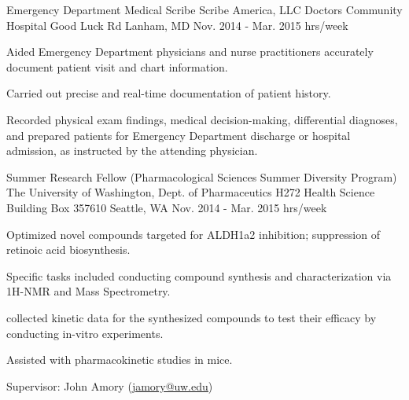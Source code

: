 \begin{cventries}
  \cventry
    {Emergency Department Medical Scribe} %
    {Scribe America, LLC } %
    {Doctors Community Hospital  Good Luck Rd \newline
Lanham, MD
} %
    {Nov. 2014 - Mar. 2015  hrs/week} %
    {
      \begin{cvitems} %
        \item {Aided Emergency Department physicians and nurse practitioners accurately document patient visit and chart information.}
        \item{Carried out precise and real-time documentation of patient history.}
        \item{Recorded physical exam findings, medical decision-making, differential diagnoses, and prepared patients for Emergency Department discharge or hospital admission, as instructed by the attending physician.}
      \end{cvitems}
    }



  \cventry
    {
Summer Research Fellow (Pharmacological Sciences Summer Diversity Program) }%
    {The University of Washington, Dept. of Pharmaceutics  } %
    {H272 Health Science Building \newline
Box 357610 \newline
Seattle, WA
} %
    {Nov. 2014 - Mar. 2015  hrs/week} %
    {
      \begin{cvitems} %
        \item {Optimized novel compounds targeted for ALDH1a2 inhibition; suppression of retinoic acid biosynthesis.}
        \item{Specific tasks included conducting compound synthesis and characterization via 1H-NMR and Mass Spectrometry.}
        \item{collected kinetic data for the synthesized compounds to test their efficacy by conducting in-vitro experiments.}
        \item{Assisted with pharmacokinetic studies in mice.}
         \item{Supervisor: John Amory (\textcolor{navyblue}{
        {\underline{\href{mailto:jamory@uw.edu}{jamory@uw.edu}}}})}
      \end{cvitems}
    }


\end{cventries}
